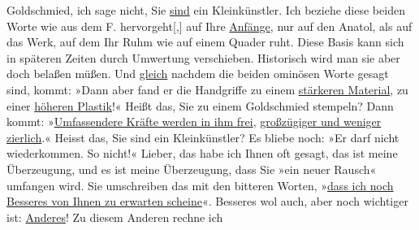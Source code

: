 \begin{ledgroupsized}[t]{13cm}
               Goldschmied, ich sage nicht, Sie \uline{sind} ein
               Kleinkünstler. Ich beziehe diese beiden Worte wie aus dem F. hervorgeht{[},{]}{ } auf Ihre \uline{Anfänge},
               nur auf den Anatol, als auf das Werk, auf dem
               Ihr Ruhm wie auf einem Quader ruht. Diese Basis kann sich in späteren Zeiten durch
               Umwertung verschieben. Historisch wird man sie aber doch belaßen müßen. Und \uline{gleich} nachdem die beiden ominösen Worte gesagt sind,
               kommt: »Dann aber fand er die
                  Handgriffe zu einem \uline{stärkeren Material}, zu einer
                     \uline{höheren Plastik}!« Heißt das, Sie zu einem
               Goldschmied stempeln? Dann kommt: »\uline{Umfassendere Kräfte werden in ihm frei}, \uline{großzügiger und weniger zierlich}.« Heisst das,
               Sie sind ein Kleinkünstler? \pend
           \pstart
           Es bliebe noch: »Er darf nicht
                  wiederkommen. So nicht!« Lieber, das habe ich Ihnen oft gesagt, das ist meine
               Überzeugung, und es ist meine Überzeugung, dass Sie »ein neuer Rausch« umfangen wird.
               Sie umschreiben das mit den bitteren Worten, »\uline{dass ich
                  noch Besseres von Ihnen zu erwarten scheine}«. Besseres wol auch, aber noch
               wichtiger ist: \uline{Anderes}! Zu diesem Anderen rechne ich

\end{ledgroupsized}
